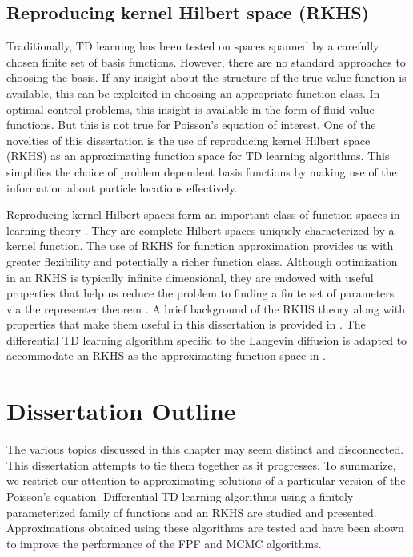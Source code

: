 \subsection{Reproducing kernel Hilbert space (RKHS)}
\label{s:rkhs}
Traditionally, TD learning has been tested on spaces spanned by a carefully chosen finite set of basis functions. However, there are no standard approaches to choosing the basis.  If any insight about the structure of the true value function is available, this can be exploited in choosing an appropriate function class. In optimal control problems, this insight is available in the form of fluid value functions. But this is not true for Poisson's equation of interest. One of the novelties of this dissertation is the use of reproducing kernel Hilbert space (RKHS) as an approximating function space for TD learning algorithms. This simplifies the choice of problem dependent basis functions by making use of the information about particle locations effectively. 
 
Reproducing kernel Hilbert spaces form an important class of function spaces in learning theory \cite{aro50, schsmo01}. They are complete Hilbert spaces uniquely characterized by a kernel function. The use of RKHS for function approximation provides us with greater flexibility and potentially a richer function class. Although optimization in an RKHS is typically infinite dimensional, they are endowed with useful properties that help us reduce the problem to finding a finite set of parameters via the representer theorem \cite{kimwah71, schhersmo01}. A brief background of the RKHS theory along with properties that make them useful in this dissertation is provided in . The differential TD learning algorithm specific to the Langevin diffusion is adapted to accommodate an RKHS as the approximating function space in .
 

\section{Dissertation Outline}
\label{s:outline}
The various topics discussed in this chapter may seem distinct and disconnected. This dissertation attempts to tie them together as it progresses. To summarize, we restrict our attention to approximating solutions of a particular version of the Poisson's equation. Differential TD learning algorithms using a finitely parameterized family of functions and an RKHS are studied and presented. Approximations obtained using these algorithms are tested and have been shown to improve the performance of the FPF and MCMC algorithms. 


